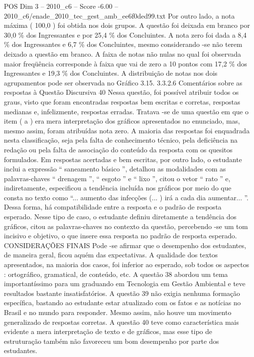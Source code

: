 \begin{textsample}{POS Dim 3 – 2010\_c6 – Score -6.00 – 2010\_c6/enade\_2010\_tec\_gest\_amb\_ee6f0ded99.txt}
Por outro lado, a nota máxima ( 100,0 ) foi obtida nos dois grupos.
A questão foi deixada em branco por 30,0 \% dos Ingressantes e por 25,4 \% dos Concluintes.
A nota zero foi dada a 8,4 \% dos Ingressantes e 6,7 \% dos Concluintes, mesmo considerando -se não terem deixado a questão em branco.
A faixa de notas não nulas no qual foi observada maior freqüência corresponde à faixa que vai de zero a 10 pontos com 17,2 \% dos Ingressantes e 19,3 \% dos Concluintes.
A distribuição de notas nos dois agrupamentos pode ser observada no Gráfico 3.15. 3.3.2.6 Comentários sobre as respostas à Questão Discursiva 40 Nessa questão, foi possível atribuir todos os graus, visto que foram encontradas respostas bem escritas e corretas, respostas medianas e, infelizmente, respostas erradas.
Tratava -se de uma questão em que o item ( a ) era mera interpretação dos gráficos apresentados no enunciado, mas, mesmo assim, foram atribuídas nota zero.
A maioria das respostas foi enquadrada nesta classificação, seja pela falta de conhecimento técnico, pela deficiência na redação ou pela falta de associação do conteúdo da resposta com os quesitos formulados.
Em respostas acertadas e bem escritas, por outro lado, o estudante inclui a expressão “ saneamento básico ”, detalhou as modalidades com as palavras-chaves “ drenagem ”, “ esgoto ” e “ lixo ”, citou o vetor “ rato ” e, indiretamente, especificou a tendência incluída nos gráficos por meio do que consta no texto como “... aumento das infecções (... ) irá a cada dia aumentar... ”.
Dessa forma, há compatibilidade entre a resposta e o padrão de resposta esperado.
Nesse tipo de caso, o estudante definiu diretamente a tendência dos gráficos, citou as palavras-chaves no contexto da questão, percebendo -se um tom incisivo e objetivo, o que insere essa resposta no padrão de resposta esperado.
CONSIDERAÇÕES FINAIS Pode -se afirmar que o desempenho dos estudantes, de maneira geral, ficou aquém das expectativas.
A qualidade dos textos apresentados, na maioria dos casos, foi inferior ao esperado, sob todos os aspectos : ortográfico, gramatical, de conteúdo, etc.
A questão 38 abordou um tema importantíssimo para um graduando em Tecnologia em Gestão Ambiental e teve resultados bastante insatisfatórios.
A questão 39 não exigia nenhuma formação específica, bastando ao estudante estar atualizado com os fatos e as notícias no Brasil e no mundo para responder.
Mesmo assim, não houve um movimento generalizado de respostas corretas.
A questão 40 teve como característica mais evidente a mera interpretação de texto e de gráficos, mas esse tipo de estruturação também não favoreceu um bom desempenho por parte dos estudantes.

\end{textsample}
